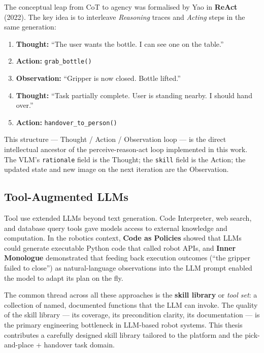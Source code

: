 The conceptual leap from CoT to agency was formalised by Yao \etal in
\textbf{ReAct} \cite{yao2022react} (2022).
The key idea is to interleave \emph{Reasoning} traces and \emph{Acting} steps in the
same generation:
\begin{enumerate}[noitemsep]
  \item \textbf{Thought:} ``The user wants the bottle. I can see one on the table.''
  \item \textbf{Action:} \texttt{grab\_bottle()}
  \item \textbf{Observation:} ``Gripper is now closed. Bottle lifted.''
  \item \textbf{Thought:} ``Task partially complete. User is standing nearby. I should
        hand over.''
  \item \textbf{Action:} \texttt{handover\_to\_person()}
\end{enumerate}
This structure --- Thought / Action / Observation loop --- is the direct intellectual
ancestor of the perceive-reason-act loop implemented in this work.
The VLM's \texttt{rationale} field is the Thought; the \texttt{skill} field is the
Action; the updated state and new image on the next iteration are the Observation.

\subsection{Tool-Augmented LLMs}

Tool use extended LLMs beyond text generation.
Code Interpreter, web search, and database query tools gave models access to external
knowledge and computation.
In the robotics context, \textbf{Code as Policies} \cite{liang2023code} showed that
LLMs could generate executable Python code that called robot APIs, and
\textbf{Inner Monologue} \cite{huang2022inner} demonstrated that feeding back
execution outcomes (``the gripper failed to close'') as natural-language observations
into the LLM prompt enabled the model to adapt its plan on the fly.

The common thread across all these approaches is the \textbf{skill library} or
\emph{tool set}: a collection of named, documented functions that the LLM can invoke.
The quality of the skill library --- its coverage, its precondition clarity, its
documentation --- is the primary engineering bottleneck in LLM-based robot systems.
This thesis contributes a carefully designed skill library tailored to the \tiago{}
platform and the pick-and-place + handover task domain.

